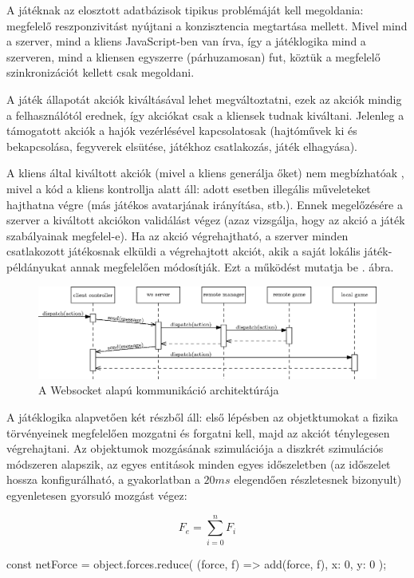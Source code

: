 \documentclass[11pt]{article}
\begin{document}
A játéknak az elosztott adatbázisok tipikus problémáját kell megoldania:
megfelelő reszponzivitást nyújtani a konzisztencia megtartása mellett.
Mivel mind a szerver, mind a kliens JavaScript-ben van írva, így a játéklogika
mind a szerveren, mind a kliensen egyszerre (párhuzamosan) fut,
köztük a megfelelő szinkronizációt kellett csak megoldani.

A játék állapotát akciók kiváltásával lehet megváltoztatni, ezek az akciók
mindig a felhasználótól erednek, így akciókat csak a kliensek tudnak kiváltani.
Jelenleg a támogatott akciók a hajók vezérlésével kapcsolatosak (hajtóművek ki
és bekapcsolása, fegyverek elsütése, játékhoz csatlakozás, játék elhagyása).

A kliens által kiváltott akciók (mivel a kliens generálja őket) nem megbízhatóak
, mivel a kód a kliens kontrollja alatt áll: adott esetben illegális műveleteket
hajthatna végre (más játékos avatarjának irányítása, stb.).
Ennek megelőzésére a szerver a kiváltott akciókon validálást végez (azaz vizsgálja,
hogy az akció a játék szabályainak megfelel-e).
Ha az akció végrehajtható, a szerver minden csatlakozott játékosnak elküldi
a végrehajtott akciót, akik a saját lokális játék-példányukat annak megfelelően módosítják.
Ezt a működést mutatja be . ábra.

\begin{figure}[h!]
  \centering
  \includegraphics[width=\textwidth]{figures/ws}
  \caption{A Websocket alapú kommunikáció architektúrája}
  \label{fig:ws-arch}
\end{figure}

A játéklogika alapvetően két részből áll: első lépésben az objetktumokat a fizika
törvényeinek megfelelően mozgatni és forgatni kell, majd az akciót ténylegesen végrehajtani.
Az objektumok mozgásának szimulációja a diszkrét szimulációs módszeren alapszik,
az egyes entitások minden egyes időszeletben (az időszelet hossza konfigurálható,
a gyakorlatban a $20ms$ elegendően részletesnek bizonyult) egyenletesen gyorsuló
mozgást végez:

\[
  F_e = \sum_{i=0}^nF_i
\]

\begin{js}
  const netForce = object.forces.reduce(
    (force, f) => add(force, f),
    { x: 0, y: 0 }
  );
\end{js}
\end{document}
